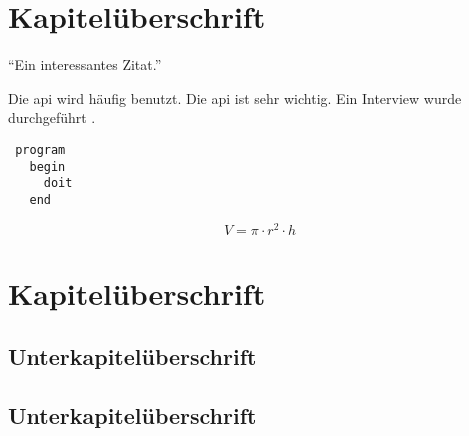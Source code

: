 \documentclass{custom}
\begin{document}
\mycover
\myconfidentiality

\begin{frontmatter}

\mytableofcontents
\mylistoffigures
\mylistoftables
\mylistofacronyms

\end{frontmatter}

\begin{mainmatter}

\section{Kapitelüberschrift}

\enquote{Ein interessantes Zitat.} \cite[1]{test}

Die \gls{api} wird häufig benutzt. Die \gls{api} ist sehr wichtig. Ein Interview wurde durchgeführt .

\begin{verbatim}
 program
   begin
     doit
   end
\end{verbatim}

\begin{equation}
V= \pi \cdot r^{2} \cdot h
\end{equation}

\lipsum

\section{Kapitelüberschrift}

\lipsum

\subsection{Unterkapitelüberschrift}

\lipsum

\subsection{Unterkapitelüberschrift}

\lipsum

\end{mainmatter}

\begin{backmatter}

\mybibliography

\mylistofappendices


\mydeclaration

\end{backmatter}
\end{document}
